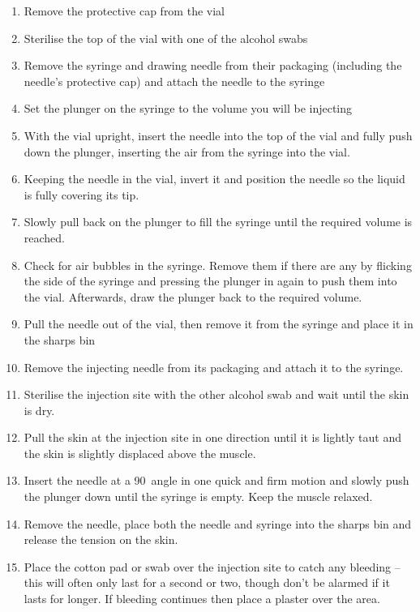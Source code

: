 \documentclass[twoside,a5paper]{article}
\begin{document}
\begin{enumerate}
\item Remove the protective cap from the vial
\item Sterilise the top of the vial with one of the alcohol swabs
\item Remove the syringe and drawing needle from their packaging
  (including the needle's protective cap) and attach the needle to the
  syringe
\item Set the plunger on the syringe to the volume you will be injecting
\item With the vial upright, insert the needle into the top of the
  vial and fully push down the plunger, inserting the air from the
  syringe into the vial.
\item Keeping the needle in the vial, invert it and position the
  needle so the liquid is fully covering its tip.
\item Slowly pull back on the plunger to fill the syringe until the
  required volume is reached.
\item Check for air bubbles in the syringe. Remove them if there are
  any by flicking the side of the syringe and pressing the plunger in
  again to push them into the vial.  Afterwards, draw the plunger back
  to the required volume.
\item Pull the needle out of the vial, then remove it from the syringe
  and place it in the sharps bin
\item Remove the injecting needle from its packaging and attach it to
  the syringe.
\item Sterilise the injection site with the other alcohol swab and
  wait until the skin is dry.
\item Pull the skin at the injection site in one direction until it is
  lightly taut and the skin is slightly displaced above the muscle.
\item Insert the needle at a 90\textdegree\ angle in one quick and firm
  motion and slowly push the plunger down until the syringe is empty.
  Keep the muscle relaxed.
\item Remove the needle, place both the needle and syringe into the
  sharps bin and release the tension on the skin.
\item Place the cotton pad or swab over the injection site to catch
  any bleeding -- this will often only last for a second or two,
  though don't be alarmed if it lasts for longer.  If bleeding
  continues then place a plaster over the area.
\end{enumerate}
\end{document}
